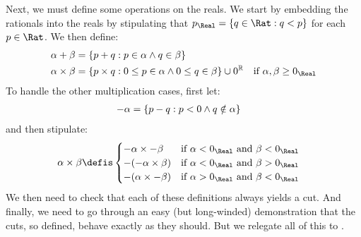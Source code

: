 \documentclass[../../../include/open-logic-section]{subfiles}
\begin{document}
Next, we must define some operations on the reals. We start by
embedding the rationals into the reals by stipulating that $p_\Real =
\Setabs{q \in \Rat}{q < p}$ for each $p \in \Rat$. We then define:
\begin{align*}
	\alpha + \beta &= \Setabs{p + q}{p \in \alpha \land q \in \beta}\\
	\alpha \times \beta &= 
	\Setabs{p \times q}{0 \leq p \in \alpha \land 0 \leq q \in \beta} \cup 0^\mathbb{R} & \text{if }\alpha, \beta \geq 0_\Real
\end{align*}
To handle the other multiplication cases, first let: %
\begin{align*}
	-\alpha &= \{ p - q : p < 0 \land q \notin \alpha \}
\end{align*}
and then stipulate:
\begin{align*}
	\alpha \times \beta &\defis 
	\begin{cases}
		\mathord{-}\alpha \times \mathord{-}\beta &\text{if }\alpha < 0_\Real\text{ and }\beta < 0_\Real\\
		\mathord{-}(\mathord{-}\alpha \times \beta) &\text{if }\alpha < 0_\Real \text{ and }\beta > 0_\Real\\
		\mathord{-}(\alpha \times \mathord{-}\beta) &\text{if }\alpha > 0_\Real \text{ and }\beta < 0_\Real
	\end{cases}
\end{align*}
We then need to check that each of these definitions always yields a
cut. And finally, we need to go through an easy (but long-winded)
demonstration that the cuts, so defined, behave exactly as they
should. But we relegate all of this to .
\end{document}
